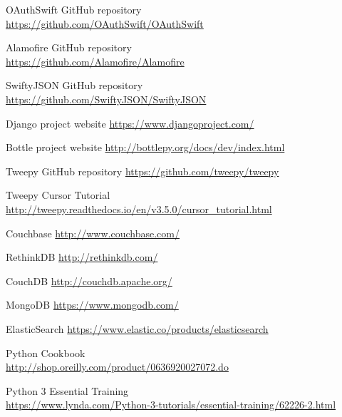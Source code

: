 \documentclass{article}
\begin{document}
\begin{thebibliography}{9}
    OAuthSwift GitHub repository \\
    \url{https://github.com/OAuthSwift/OAuthSwift}
    
    Alamofire GitHub repository \\
    \url{https://github.com/Alamofire/Alamofire}
    
    SwiftyJSON GitHub repository \\
    \url{https://github.com/SwiftyJSON/SwiftyJSON}
    
    Django project website \url{https://www.djangoproject.com/}
    
    Bottle project website \url{http://bottlepy.org/docs/dev/index.html}
    
    Tweepy GitHub repository \url{https://github.com/tweepy/tweepy}

    Tweepy Cursor Tutorial \\ 
    \url{http://tweepy.readthedocs.io/en/v3.5.0/cursor_tutorial.html}
    
    Couchbase \url{http://www.couchbase.com/}
    
    RethinkDB \url{http://rethinkdb.com/}

    CouchDB \url{http://couchdb.apache.org/}

    MongoDB \url{https://www.mongodb.com/}

    ElasticSearch \url{https://www.elastic.co/products/elasticsearch}
    
    Python Cookbook \\
    \url{http://shop.oreilly.com/product/0636920027072.do}
    
    Python 3 Essential Training \\ \url{https://www.lynda.com/Python-3-tutorials/essential-training/62226-2.html}

\end{thebibliography}


\newpage
\end{document}
